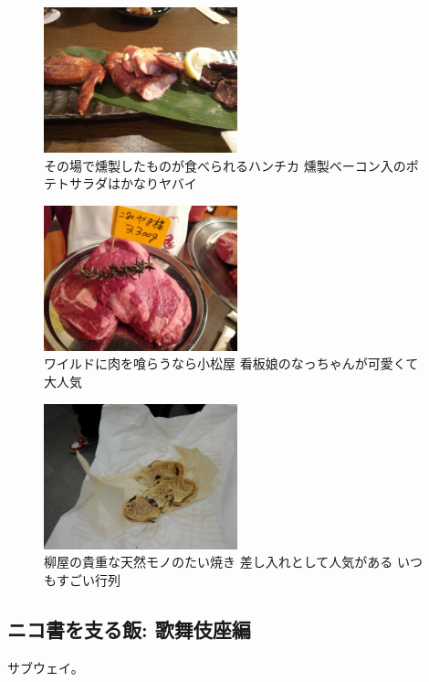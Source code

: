 \begin{figure}[H]
  \centering
  \includegraphics[width=0.5\textwidth]{../images/hanchika.jpg}
  \caption{その場で燻製したものが食べられるハンチカ 燻製ベーコン入のポテトサラダはかなりヤバイ}
\end{figure}

\begin{figure}[H]
  \centering
  \includegraphics[width=0.5\textwidth]{../images/komatsuya.jpg}
  \caption{ワイルドに肉を喰らうなら小松屋 看板娘のなっちゃんが可愛くて大人気}
\end{figure}

\begin{figure}[H]
  \centering
  \includegraphics[width=0.5\textwidth]{../images/yanagiya.jpg}
  \caption{柳屋の貴重な天然モノのたい焼き 差し入れとして人気がある いつもすごい行列}
\end{figure}

\subsection{ニコ書を支る飯: 歌舞伎座編}

サブウェイ。
